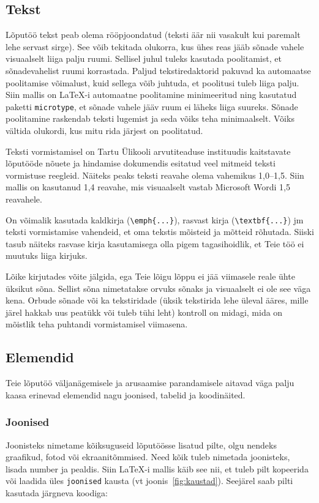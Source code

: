 \subsection{Tekst}
Lõputöö tekst peab olema rööpjoondatud (teksti äär nii vasakult kui paremalt lehe servast sirge). See võib tekitada olukorra, kus ühes reas jääb sõnade vahele visuaalselt liiga palju ruumi. Sellisel juhul tuleks kasutada poolitamist, et sõnadevahelist ruumi korrastada. Paljud tekstiredaktorid pakuvad ka automaatse poolitamise võimalust, kuid sellega võib juhtuda, et poolitusi tuleb liiga palju. Siin mallis on LaTeX-i automaatne poolitamine minimeeritud ning kasutatud paketti \verb|microtype|, et sõnade vahele jääv ruum ei läheks liiga suureks. Sõnade poolitamine raskendab teksti lugemist ja seda võiks teha minimaalselt. Võiks vältida olukordi, kus mitu rida järjest on poolitatud.

Teksti vormistamisel on Tartu Ülikooli arvutiteaduse instituudis kaitstavate lõputööde nõuete ja hindamise dokumendis esitatud veel mitmeid teksti vormistuse reegleid. Näiteks peaks teksti reavahe olema vahemikus 1,0–1,5. Siin mallis on kasutanud 1,4 reavahe, mis visuaalselt vastab Microsoft Wordi 1,5 reavahele.

On võimalik kasutada kaldkirja (\verb|\emph{...}|), rasvast kirja (\verb|\textbf{...}|) jm teksti vormistamise vahendeid, et oma tekstis mõisteid ja mõtteid rõhutada. Siiski tasub näiteks rasvase kirja kasutamisega olla pigem tagasihoidlik, et Teie töö ei muutuks liiga kirjuks.

Lõike kirjutades võite jälgida, ega Teie lõigu lõppu ei jää viimasele reale ühte üksikut sõna. Sellist sõna nimetatakse orvuks sõnaks ja visuaalselt ei ole see väga kena. Orbude sõnade või ka tekstiridade (üksik tekstirida lehe üleval ääres, mille järel hakkab uus peatükk või tuleb tühi leht) kontroll on midagi, mida on mõistlik teha puhtandi vormistamisel viimasena.

\subsection{Elemendid}
Teie lõputöö väljanägemisele ja arusaamise parandamisele aitavad väga palju kaasa erinevad elemendid nagu joonised, tabelid ja koodinäited.

\subsubsection{Joonised}
Joonisteks nimetame kõiksuguseid lõputöösse lisatud pilte, olgu nendeks graafikud, fotod või ekraanitõmmised. Need kõik tuleb nimetada joonisteks, lisada number ja pealdis. Siin LaTeX-i mallis käib see nii, et tuleb pilt kopeerida või laadida üles \verb|joonised| kausta (vt joonis~\ref{fig:kaustad}). Seejärel saab pilti kasutada järgneva koodiga:

